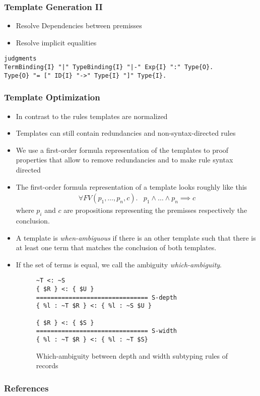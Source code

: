 \documentclass{beamer}
\begin{document}
\begin{frame}[fragile]
  \frametitle{Template Generation II}
\begin{itemize}
\item Resolve Dependencies between premisses
\item Resolve implicit equalities
\end{itemize}

\begin{lstlisting}
judgments
TermBinding{I} "|" TypeBinding{I} "|-" Exp{I} ":" Type{O}.
Type{O} "= [" ID{I} "->" Type{I} "]" Type{I}.
\end{lstlisting}

\end{frame}

\renewcommand*\selectTemplateOptimization{orange}
\renewcommand*\selectTemplateOptimization{}

\begin{frame}
  \frametitle{Template Optimization}
  \begin{itemize}
  \item In contrast to the rules templates are normalized
  \item Templates can still contain redundancies and
    non-syntax-directed rules
  \item We use a first-order formula representation of the templates
    to proof properties that allow to remove redundancies and to make
    rule syntax directed
  \item The first-order formula representation of a template looks
    roughly like this
    \begin{align}
      \forall FV(p_1,\dots, p_n, c) .& p_1 \land \dots \land p_n
      \implies c
    \end{align}
    where $p_i$ and $c$ are propositions representing the premisses
    respectively the conclusion.
  \end{itemize}

\framebreak{}

  \begin{itemize}
  \item A template is \textit{when-ambiguous} if there is an other
    template such that there is at least one term that matches the
    conclusion of both templates.
  \item If the set of terms is equal, we call the ambiguity
    \textit{which-ambiguity}.
\begin{figure}
\begin{verbatim}
~T <: ~S
{ $R } <: { $U }
=============================== S-depth
{ %l : ~T $R } <: { %l : ~S $U }

{ $R } <: { $S }
=============================== S-width
{ %l : ~T $R } <: { %l : ~T $S}
\end{verbatim}
\caption{Which-ambiguity between depth and width subtyping rules of records}
\end{figure}
\end{itemize}
\end{frame}


\begin{frame}
  \frametitle{References}
  
  
\end{frame}
\end{document}
